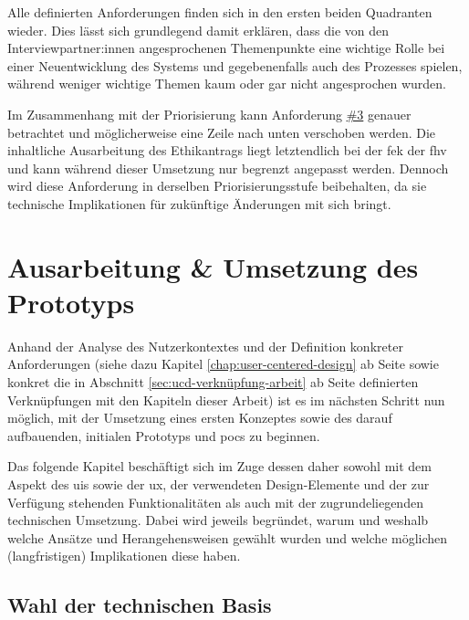 \documentclass[a4paper,12pt,twoside]{scrreprt}
\begin{document}
Alle definierten Anforderungen finden sich in den ersten beiden Quadranten wieder. Dies lässt sich grundlegend damit erklären, dass die von den Interviewpartner:innen angesprochenen Themenpunkte eine wichtige Rolle bei einer Neuentwicklung des Systems und gegebenenfalls auch des Prozesses spielen, während weniger wichtige Themen kaum oder gar nicht angesprochen wurden.

\medskip

Im Zusammenhang mit der Priorisierung kann Anforderung \hyperref[sub-sub-sec:abgeleitete-anforderungen-während-erstellung-einreichung]{\#3} genauer betrachtet und möglicherweise eine Zeile nach unten verschoben werden. Die inhaltliche Ausarbeitung des Ethikantrags liegt letztendlich bei der \ac{fek} der \ac{fhv} und kann während dieser Umsetzung nur begrenzt angepasst werden. Dennoch wird diese Anforderung in derselben Priorisierungsstufe beibehalten, da sie technische Implikationen für zukünftige Änderungen mit sich bringt.

\cleardoublepage
\chapter{Ausarbeitung \& Umsetzung des Prototyps}
\label{chap:ausarbeitung-umsetzung-prototyp}

Anhand der Analyse des Nutzerkontextes und der Definition konkreter Anforderungen (siehe dazu Kapitel \ref{chap:user-centered-design} ab Seite \pageref{chap:user-centered-design} sowie konkret die in Abschnitt \ref{sec:ucd-verknüpfung-arbeit} ab Seite \pageref{sec:ucd-verknüpfung-arbeit} definierten Verknüpfungen mit den Kapiteln dieser Arbeit) ist es im nächsten Schritt nun möglich, mit der Umsetzung eines ersten Konzeptes sowie des darauf aufbauenden, initialen Prototyps und \aclp{poc} zu beginnen.

Das folgende Kapitel beschäftigt sich im Zuge dessen daher sowohl mit dem Aspekt des \aclp{ui} sowie der \ac{ux}, der verwendeten Design-Elemente und der zur Verfügung stehenden Funktionalitäten als auch mit der zugrundeliegenden technischen Umsetzung. Dabei wird jeweils begründet, warum und weshalb welche Ansätze und Herangehensweisen gewählt wurden und welche möglichen (langfristigen) Implikationen diese haben.

\section{Wahl der technischen Basis}
\label{sec:ausarbeitung-wahl-technische-basis}
\end{document}
